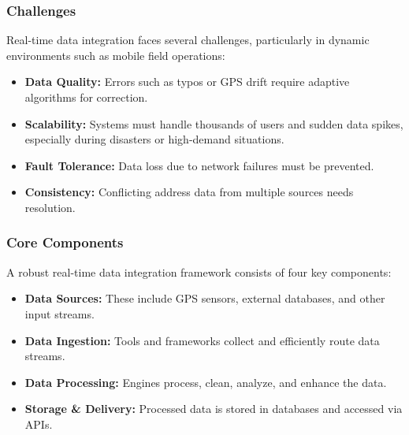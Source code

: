         \subsubsection{Challenges}
        Real-time data integration faces several challenges, particularly in dynamic environments such as mobile field operations: 
        
        \begin{itemize}
            \item \textbf{Data Quality:} Errors such as typos or GPS drift require adaptive algorithms for correction.
        
            \item \textbf{Scalability:} Systems must handle thousands of users and sudden data spikes, especially during disasters or high-demand situations.
        
            \item \textbf{Fault Tolerance:} Data loss due to network failures must be prevented.
        
            \item \textbf{Consistency:} Conflicting address data from multiple sources needs resolution.
        \end{itemize}
        \autocite{vexdata2024Jun}
                
        \subsubsection{Core Components}

        A robust real-time data integration framework consists of four key components: 

    \begin{itemize}
        \item \textbf{Data Sources:} These include GPS sensors, external databases, and other input streams.  

        \item \textbf{Data Ingestion:} Tools and frameworks collect and efficiently route data streams.  

        \item \textbf{Data Processing:} Engines process, clean, analyze, and enhance the data.  

        \item \textbf{Storage \& Delivery:} Processed data is stored in databases and accessed via APIs.

    \end{itemize}
    \autocite{Limited2025Mar}

